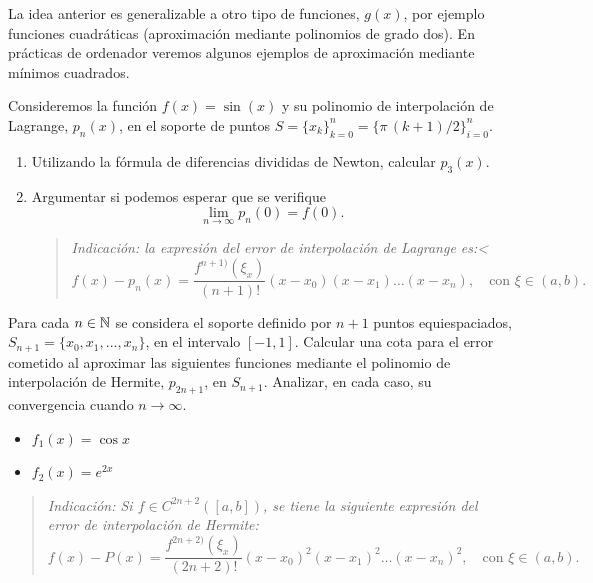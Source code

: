 La idea anterior es generalizable a otro tipo de funciones, $g(x)$,
por ejemplo funciones cuadráticas (aproximación mediante polinomios de
grado dos).  En prácticas de ordenador veremos algunos ejemplos de
aproximación mediante mínimos cuadrados.

\begin{problemas}

  \begin{problema}
    Consideremos la función $f(x)=\sin(x)$ y su polinomio de
    interpolación de Lagrange, $p_n(x)$, en el soporte de puntos
    $S=\{x_k\}_{k=0}^n= \{\pi\,(k+1)/2\}_{i=0}^n$.
    \begin{enumerate}
    \item Utilizando la fórmula de diferencias divididas de Newton,
      calcular $p_3(x)$.
    \item Argumentar si podemos esperar que se verifique
      $$
      \lim_{n\to\infty} p_n(0) = f(0).
      $$
      \begin{quote}\em\small
      Indicación: la expresión del error de interpolación de Lagrange es:<
      \begin{equation*}
        f(x)-p_n(x)=\frac{f^{n+1)}(\xi_x)}{(n+1)!}
        (x-x_0)(x-x_1)\dots(x-x_n), \quad\text{con } \xi\in (a,b).
      \end{equation*}
    \end{quote}
  \end{enumerate}
  \end{problema}

  \begin{problema}
    Para cada $n\in\operatorname{{\mathbb N}}$ se considera el soporte definido por $n+1$
    puntos equiespaciados, $S_{n+1}=\{x_0,x_1,...,x_n\}$, en el intervalo
    $[-1,1]$.  Calcular una cota para el error cometido al aproximar
    las siguientes funciones mediante el polinomio de interpolación
    de Hermite, $p_{2n+1}$, en $S_{n+1}$. Analizar, en cada caso, su
    convergencia cuando $n\to\infty$.
    \begin{itemize}
    \item $\displaystyle f_1(x)=\cos x$
    \item $\displaystyle f_2(x)=e^{2x}$
    \end{itemize}
    \begin{quote}\em\small
      Indicación: Si $f\in C^{2n+2}([a,b])$, se tiene la siguiente
      expresión del error de interpolación de Hermite:
      \begin{equation*}
        f(x)-P(x)=\frac{f^{2n+2)}(\xi_x)}{(2n+2)!}
        (x-x_0)^2(x-x_1)^2\dots(x-x_n)^2, \quad\text{con } \xi\in (a,b).
      \end{equation*}
    \end{quote}
  \end{problema}


\end{problemas}
